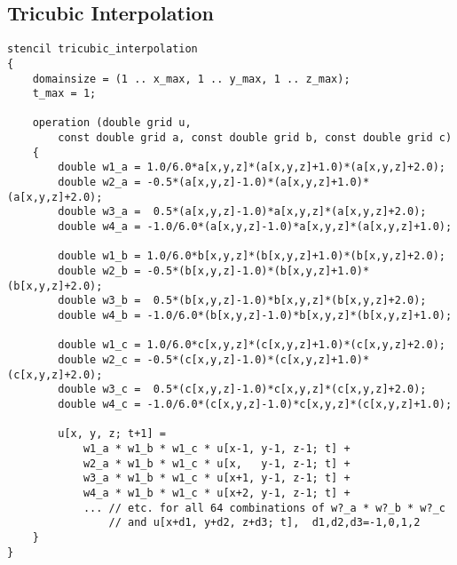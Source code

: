 \subsection{Tricubic Interpolation}
\begin{lstlisting}[language=stencil]
stencil tricubic_interpolation
{
	domainsize = (1 .. x_max, 1 .. y_max, 1 .. z_max);
	t_max = 1;

	operation (double grid u,
		const double grid a, const double grid b, const double grid c)
	{
		double w1_a = 1.0/6.0*a[x,y,z]*(a[x,y,z]+1.0)*(a[x,y,z]+2.0);
		double w2_a = -0.5*(a[x,y,z]-1.0)*(a[x,y,z]+1.0)*(a[x,y,z]+2.0);
		double w3_a =  0.5*(a[x,y,z]-1.0)*a[x,y,z]*(a[x,y,z]+2.0);
		double w4_a = -1.0/6.0*(a[x,y,z]-1.0)*a[x,y,z]*(a[x,y,z]+1.0);

		double w1_b = 1.0/6.0*b[x,y,z]*(b[x,y,z]+1.0)*(b[x,y,z]+2.0);
		double w2_b = -0.5*(b[x,y,z]-1.0)*(b[x,y,z]+1.0)*(b[x,y,z]+2.0);
		double w3_b =  0.5*(b[x,y,z]-1.0)*b[x,y,z]*(b[x,y,z]+2.0);
		double w4_b = -1.0/6.0*(b[x,y,z]-1.0)*b[x,y,z]*(b[x,y,z]+1.0);

		double w1_c = 1.0/6.0*c[x,y,z]*(c[x,y,z]+1.0)*(c[x,y,z]+2.0);
		double w2_c = -0.5*(c[x,y,z]-1.0)*(c[x,y,z]+1.0)*(c[x,y,z]+2.0);
		double w3_c =  0.5*(c[x,y,z]-1.0)*c[x,y,z]*(c[x,y,z]+2.0);
		double w4_c = -1.0/6.0*(c[x,y,z]-1.0)*c[x,y,z]*(c[x,y,z]+1.0);
		
		u[x, y, z; t+1] =
			w1_a * w1_b * w1_c * u[x-1, y-1, z-1; t] +
			w2_a * w1_b * w1_c * u[x,   y-1, z-1; t] +
			w3_a * w1_b * w1_c * u[x+1, y-1, z-1; t] +
			w4_a * w1_b * w1_c * u[x+2, y-1, z-1; t] +
			... // etc. for all 64 combinations of w?_a * w?_b * w?_c
			    // and u[x+d1, y+d2, z+d3; t],  d1,d2,d3=-1,0,1,2
	}
}
\end{lstlisting}
